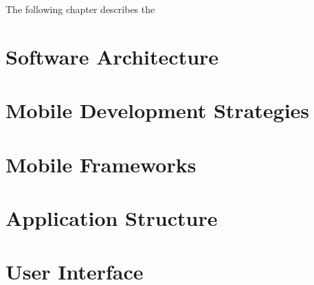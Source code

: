 The following chapter describes the

\section{Software Architecture}


\section{Mobile Development Strategies}


\section{Mobile Frameworks}


\section{Application Structure}


\section{User Interface}


